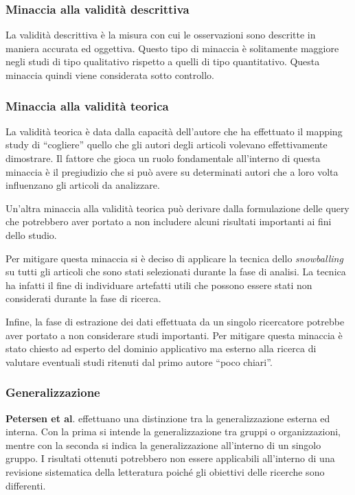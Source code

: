\subsubsection{Minaccia alla validità descrittiva}
La validità descrittiva è la misura con cui le osservazioni sono descritte in maniera accurata ed oggettiva. Questo tipo di minaccia è solitamente maggiore negli studi di tipo qualitativo rispetto a quelli di tipo quantitativo. Questa minaccia quindi viene considerata sotto controllo.
\subsubsection{Minaccia alla validità teorica}
La validità teorica è data dalla capacità dell’autore che ha effettuato il mapping study di “cogliere” quello che gli autori degli articoli volevano effettivamente dimostrare. Il fattore che gioca un ruolo fondamentale all’interno di questa minaccia è il pregiudizio che si può avere su determinati autori che a loro
volta influenzano gli articoli da analizzare.

Un'altra minaccia alla validità teorica può derivare dalla formulazione delle
query che potrebbero aver portato a non includere alcuni risultati importanti ai fini dello studio.

Per mitigare questa minaccia si è deciso di applicare la tecnica dello
\emph{snowballing} su tutti gli articoli che sono stati selezionati durante la fase di analisi.
La tecnica ha infatti il fine di individuare artefatti utili che possono essere stati non considerati durante la fase di ricerca.

Infine, la fase di estrazione dei dati effettuata da un singolo ricercatore potrebbe aver portato a non considerare studi importanti. Per mitigare questa minaccia è stato chiesto ad esperto del dominio applicativo ma esterno alla ricerca
di valutare eventuali studi ritenuti dal primo autore “poco chiari”.
\subsubsection{Generalizzazione}
\textbf{Petersen et al}. effettuano una distinzione tra la generalizzazione esterna ed interna. Con la prima si intende la generalizzazione tra gruppi o organizzazioni, mentre con la seconda si indica la generalizzazione all’interno di un singolo gruppo.
I risultati ottenuti potrebbero non essere applicabili all’interno di una revisione sistematica della letteratura poiché gli obiettivi delle ricerche sono differenti.

